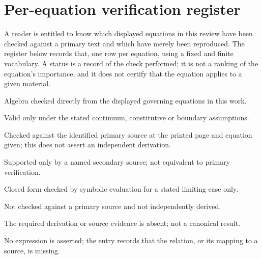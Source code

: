 
\section{Per-equation verification register}\label{sec:eqregister}

A reader is entitled to know which displayed equations in this review have been checked against a
primary text and which have merely been reproduced. The register below records that, one row per
equation, using a fixed and finite vocabulary. A status is a record of the check performed; it is not a
ranking of the equation's importance, and it does not certify that the equation applies to a given
material.

\begin{description}[leftmargin=1.6em,style=nextline]
\item[DERIVED] Algebra checked directly from the displayed governing equations in this work.
\item[CONDITIONAL] Valid only under the stated continuum, constitutive or boundary assumptions.
\item[PRIMARY-SOURCE-CHECKED] Checked against the identified primary source at the printed page and
  equation given; this does not assert an independent derivation.
\item[SECONDARY-SOURCE] Supported only by a named secondary source; not equivalent to primary verification.
\item[VERIFIED-SYMBOLIC] Closed form checked by symbolic evaluation for a stated limiting case only.
\item[UNVERIFIED] Not checked against a primary source and not independently derived.
\item[OPEN] The required derivation or source evidence is absent; not a canonical result.
\item[WITHHELD] No expression is asserted; the entry records that the relation, or its mapping to a
  source, is missing.
\end{description}

